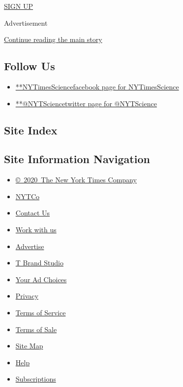 \href{/newsletters/signup/SC}{SIGN UP}

Advertisement

\protect\hyperlink{after-mktg}{Continue reading the main story}

\hypertarget{follow-us}{%
\subsection{Follow Us}\label{follow-us}}

\begin{itemize}
\tightlist
\item
  \href{https://www.facebook.com/NYTimesScience}{**NYTimesSciencefacebook
  page for NYTimesScience}
\item
  \href{https://twitter.com/NYTScience}{**@NYTSciencetwitter page for
  @NYTScience}
\end{itemize}

\hypertarget{site-index}{%
\subsection{Site Index}\label{site-index}}

\hypertarget{site-information-navigation}{%
\subsection{Site Information
Navigation}\label{site-information-navigation}}

\begin{itemize}
\tightlist
\item
  \href{https://help.nytimes.com/hc/en-us/articles/115014792127-Copyright-notice}{©~2020~The
  New York Times Company}
\end{itemize}

\begin{itemize}
\tightlist
\item
  \href{https://www.nytco.com/}{NYTCo}
\item
  \href{https://help.nytimes.com/hc/en-us/articles/115015385887-Contact-Us}{Contact
  Us}
\item
  \href{https://www.nytco.com/careers/}{Work with us}
\item
  \href{https://nytmediakit.com/}{Advertise}
\item
  \href{http://www.tbrandstudio.com/}{T Brand Studio}
\item
  \href{https://www.nytimes.com/privacy/cookie-policy\#how-do-i-manage-trackers}{Your
  Ad Choices}
\item
  \href{https://www.nytimes.com/privacy}{Privacy}
\item
  \href{https://help.nytimes.com/hc/en-us/articles/115014893428-Terms-of-service}{Terms
  of Service}
\item
  \href{https://help.nytimes.com/hc/en-us/articles/115014893968-Terms-of-sale}{Terms
  of Sale}
\item
  \href{https://spiderbites.nytimes.com}{Site Map}
\item
  \href{https://help.nytimes.com/hc/en-us}{Help}
\item
  \href{https://www.nytimes.com/subscription?campaignId=37WXW}{Subscriptions}
\end{itemize}
